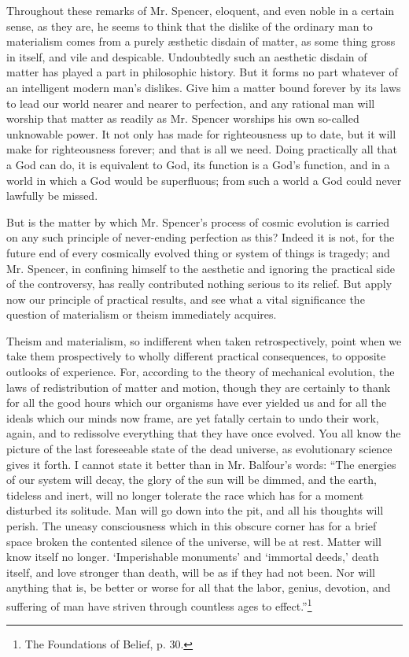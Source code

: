 \documentclass[12pt]{article}
\begin{document}
Throughout these remarks of Mr. Spencer, eloquent, and even noble in a certain sense, as they are, he seems to think that the dislike of the ordinary man to materialism comes from a purely {\ae}sthetic disdain of matter, as some thing gross in itself, and vile and despicable. Undoubtedly such an aesthetic disdain of matter has played a part in philosophic history. But it forms no part whatever of an intelligent modern man's dislikes. Give him a matter bound forever by its laws to lead our world nearer and nearer to perfection, and any rational man will worship that matter as readily as Mr. Spencer worships his own so-called unknowable power. It not only has made for righteousness up to date, but it will make for righteousness forever; and that is all we need. Doing practically all that a God can do, it is equivalent to God, its function is a God's function, and in a world in which a God would be superfluous; from such a world a God could never lawfully be missed. 

But is the matter by which Mr. Spencer's process of cosmic evolution is carried on any such principle of never-ending perfection as this? Indeed it is not, for the future end of every cosmically evolved thing or system of things is tragedy; and Mr. Spencer, in confining himself to the aesthetic and ignoring the practical side of the controversy, has really contributed nothing serious to its relief. But apply now our principle of practical results, and see what a vital significance the question of materialism or theism immediately acquires. 

Theism and materialism, so indifferent when taken retrospectively, point when we take them prospectively to wholly different practical consequences, to opposite outlooks of experience. For, according to the theory of mechanical evolution, the laws of redistribution of matter and motion, though they are certainly to thank for all the good hours which our organisms have ever yielded us and for all the ideals which our minds now frame, are yet fatally certain to undo their work, again, and to redissolve everything that they have once evolved. You all know the picture of the last foreseeable state of the dead universe, as evolutionary science gives it forth. I cannot state it better than in Mr. Balfour's words: ``The energies of our system will decay, the glory of the sun will be dimmed, and the earth, tideless and inert, will no longer tolerate the race which has for a moment disturbed its solitude. Man will go down into the pit, and all his thoughts will perish. The uneasy consciousness which in this obscure corner has for a brief space broken the contented silence of the universe, will be at rest. Matter will know itself no longer. `Imperishable monuments' and `immortal deeds,' death itself, and love stronger than death, will be as if they had not been. Nor will anything that is, be better or worse for all that the labor, genius, devotion, and suffering of man have striven through countless ages to effect.''\footnote{The Foundations of Belief, p. 30.}
\end{document}
